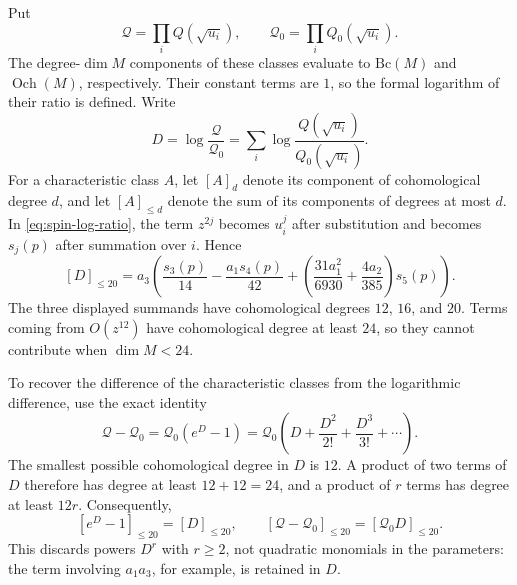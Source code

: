 \documentclass[14pt,dvipsnames]{extarticle}
\makeatletter
\numberwithin{equation}{subsection}
\theoremstyle{plain}
\theoremstyle{definition}
\theoremstyle{definition}
\renewenvironment{proof}[1][\proofname]{
 \par\pushQED{\qed}\normalfont
 \topsep6\p@\@plus6\p@\relax
 \trivlist\item[\hskip\labelsep\bfseries\itshape #1\@addpunct{.}]
}{\popQED\endtrivlist\@endpefalse}
\DeclareMathOperator{\Och}{Och}
\newcommand{\Bc}{\mathrm{Bc}}
\makeatother
\begin{document}
\begin{proof}[Proof of \cref{thm:bc-spin-below24}]
Put
\[
 \mathcal Q=\prod_iQ(\sqrt{u_i}),\qquad
 \mathcal Q_0=\prod_iQ_0(\sqrt{u_i}).
\]
The degree-$\dim M$ components of these classes evaluate to $\Bc(M)$ and
$\Och(M)$, respectively. Their constant terms are $1$, so the formal
logarithm of their ratio is defined. Write
\[
 D=\log\frac{\mathcal Q}{\mathcal Q_0}
   =\sum_i\log\frac{Q(\sqrt{u_i})}{Q_0(\sqrt{u_i})}.
\]
For a characteristic class $A$, let $[A]_d$ denote its component of
cohomological degree $d$, and let $[A]_{\leq d}$ denote the sum of its
components of degrees at most $d$. In \eqref{eq:spin-log-ratio}, the term
$z^{2j}$ becomes $u_i^j$ after substitution and becomes $s_j(p)$ after
summation over $i$. Hence
\[
 [D]_{\leq20}
 =a_3\left(\frac{s_3(p)}{14}-\frac{a_1s_4(p)}{42}
       +\left(\frac{31a_1^2}{6930}+\frac{4a_2}{385}\right)s_5(p)\right).
\]
The three displayed summands have cohomological degrees $12$, $16$, and
$20$. Terms coming from $O(z^{12})$ have cohomological degree at least
$24$, so they cannot contribute when $\dim M<24$.

To recover the difference of the characteristic classes from the
logarithmic difference, use the exact identity
\[
 \mathcal Q-\mathcal Q_0
 =\mathcal Q_0(e^D-1)
 =\mathcal Q_0\left(D+\frac{D^2}{2!}+\frac{D^3}{3!}+\cdots\right).
\]
The smallest possible cohomological degree in $D$ is $12$. A product of
two terms of $D$ therefore has degree at least $12+12=24$, and a product
of $r$ terms has degree at least $12r$. Consequently,
\[
 [e^D-1]_{\leq20}=[D]_{\leq20},\qquad
 [\mathcal Q-\mathcal Q_0]_{\leq20}
 =[\mathcal Q_0D]_{\leq20}.
\]
This discards powers $D^r$ with $r\geq2$, not quadratic monomials in the
parameters: the term involving $a_1a_3$, for example, is retained in $D$.


\end{proof}
\end{document}
